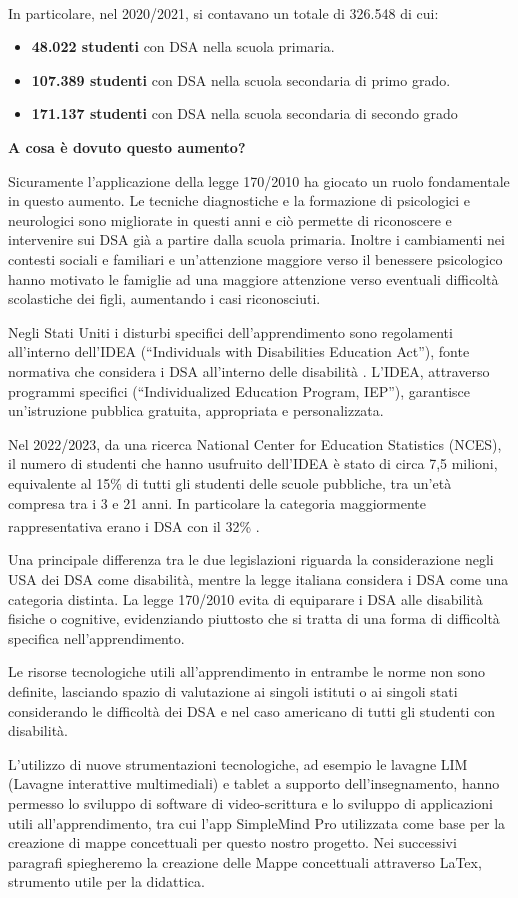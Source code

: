 \documentclass[portrait,a4paper]{article} %
\begin{document}
In particolare, nel 2020/2021, si contavano un totale di 326.548 \textsuperscript{\cite{miur}} di cui:
\begin{itemize} 
    \item \textbf{48.022 studenti} con DSA nella scuola primaria.
    \item \textbf{107.389 studenti} con DSA nella scuola secondaria di primo grado.
    \item \textbf{171.137 studenti }con DSA nella scuola secondaria di secondo grado
\end{itemize}
\noindent
\textbf{A cosa è dovuto questo aumento?}
\par
Sicuramente l’applicazione della legge 170/2010 ha giocato un ruolo fondamentale in questo aumento. Le tecniche diagnostiche e la formazione di psicologici e neurologici sono migliorate in questi anni e ciò permette di riconoscere e intervenire sui DSA già a partire dalla scuola primaria. Inoltre i cambiamenti nei contesti sociali e familiari e un'attenzione maggiore verso il benessere psicologico hanno motivato le famiglie ad una maggiore attenzione verso eventuali difficoltà scolastiche dei figli, aumentando i casi riconosciuti.
\par
Negli Stati Uniti i disturbi specifici dell'apprendimento sono regolamenti all'interno dell'IDEA (“Individuals with Disabilities Education Act”), fonte normativa che considera i DSA all’interno delle disabilità . L’IDEA, attraverso programmi specifici (“Individualized Education Program, IEP”), garantisce un'istruzione pubblica gratuita, appropriata e personalizzata.
\par
Nel 2022/2023, da una ricerca National Center for Education Statistics (NCES), il numero di studenti che hanno usufruito dell’IDEA è stato di circa 7,5 milioni, equivalente al 15\% di tutti gli studenti delle scuole pubbliche, tra un'età compresa tra i 3 e 21 anni. In particolare la categoria maggiormente rappresentativa erano i DSA con il 32\% \textsuperscript{\cite{nces}}.
\par
Una principale differenza tra le due legislazioni riguarda la considerazione negli USA dei DSA come disabilità, mentre la legge italiana considera i DSA come una categoria distinta. La legge 170/2010 evita di equiparare i DSA alle disabilità fisiche o cognitive, evidenziando piuttosto che si tratta di una forma di difficoltà specifica nell’apprendimento.
\par
Le risorse tecnologiche utili all’apprendimento in entrambe le norme non sono definite, lasciando spazio di valutazione ai singoli istituti o ai singoli stati considerando le difficoltà dei DSA e nel caso americano di tutti gli studenti con disabilità.
\par
L’utilizzo di nuove strumentazioni tecnologiche, ad esempio le lavagne LIM (Lavagne interattive multimediali) e tablet a supporto dell’insegnamento, hanno permesso lo sviluppo di software di video-scrittura e lo sviluppo di applicazioni utili all’apprendimento, tra cui l’app SimpleMind Pro utilizzata come base per la creazione di mappe concettuali per questo nostro progetto. Nei successivi paragrafi spiegheremo la creazione delle Mappe concettuali attraverso LaTex, strumento utile per la didattica.
\end{document}
